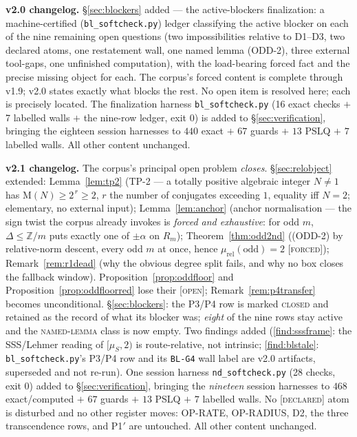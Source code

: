 \documentclass[11pt]{article}
\newcommand{\tagF}{\textcolor{cF}{\textsc{[forced]}}}
\newcommand{\tagD}{\textcolor{cD}{\textsc{[declared]}}}
\newcommand{\tagO}{\textcolor{cO}{\textsc{[open]}}}
\newcommand{\hx}[1]{\textcolor{cC}{\footnotesize\texttt{#1}}}
\newcommand{\Z}{\mathbb{Z}}
\newcommand{\M}{\mathrm{M}}
\theoremstyle{plain}
\theoremstyle{definition}
\theoremstyle{remark}
\begin{document}
\smallskip\noindent
\textbf{v2.0 changelog.} \S\ref{sec:blockers} added --- the active-blockers
finalization: a machine-certified (\texttt{bl\_softcheck.py}) ledger classifying
the active blocker on each of the nine remaining open questions (two impossibilities
relative to D1--D3, two declared atoms, one restatement wall, one named lemma
(ODD-2), three external tool-gaps, one unfinished computation), with the
load-bearing forced fact and the precise missing object for each. The corpus's
forced content is complete through v1.9; v2.0 states exactly what blocks the rest.
No open item is resolved here; each is precisely located. The finalization harness
\texttt{bl\_softcheck.py} (16 exact checks $+$ 7 labelled walls $+$ the nine-row
ledger, exit 0) is added to \S\ref{sec:verification}, bringing the eighteen session
harnesses to $440$ exact $+$ $67$ guards $+$ $13$ PSLQ $+$ $7$ labelled walls. All
other content unchanged.

\smallskip\noindent
\textbf{v2.1 changelog.} The corpus's principal open problem \emph{closes}.
\S\ref{sec:relobject} extended: Lemma~\ref{lem:tp2} (TP-2 --- a totally positive
algebraic integer $N\neq1$ has $\M(N)\ge2^{\,r}\ge2$, $r$ the number of
conjugates exceeding $1$, equality iff $N=2$; elementary, no external input);
Lemma~\ref{lem:anchor} (anchor normalisation --- the sign twist the corpus
already invokes is \emph{forced and exhaustive}: for odd $m$, $\Delta\le\Z/m$
puts exactly one of $\pm\alpha$ on $R_m$); Theorem~\ref{thm:odd2nd} ((ODD-2) by
relative-norm descent, every odd $m$ at once, hence
$\mu_{\mathrm{rel}}(\text{odd})=2$ \tagF{}); Remark~\ref{rem:r1dead} (why the
obvious degree split fails, and why no box closes the fallback window).
Proposition~\ref{prop:oddfloor} and Proposition~\ref{prop:oddfloorred} lose
their \tagO{}; Remark~\ref{rem:p4transfer} becomes unconditional.
\S\ref{sec:blockers}: the P3/P4 row is marked \textsc{closed} and retained as
the record of what its blocker was; \emph{eight} of the nine rows stay active
and the \textsc{named-lemma} class is now empty. Two findings added
(\ref{find:sssframe}: the SSS/Lehmer reading of $[\mu_S,2)$ is route-relative,
not intrinsic; \ref{find:blstale}: \texttt{bl\_softcheck.py}'s P3/P4 row and its
\hx{BL-G4} wall label are v2.0 artifacts, superseded and not re-run). One
session harness \texttt{nd\_softcheck.py} (28 checks, exit 0) added to
\S\ref{sec:verification}, bringing the \emph{nineteen} session harnesses to
$468$ exact/computed $+$ $67$ guards $+$ $13$ PSLQ $+$ $7$ labelled walls. No
\tagD{} atom is disturbed and no other register moves: OP-RATE, OP-RADIUS, D2,
the three transcendence rows, and P1$'$ are untouched. All other content
unchanged.
\end{document}
